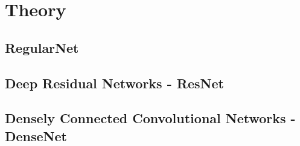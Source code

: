 \chapter{Theory}
\label{chp:theory}

\section{RegularNet}
\section{Deep Residual Networks - ResNet}
\section{Densely Connected Convolutional Networks - DenseNet}